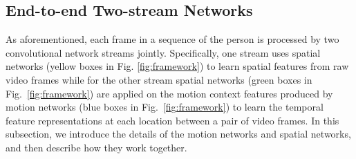 \documentclass[journal]{IEEEtran}
\begin{document}
\subsection{End-to-end Two-stream  Networks }
As aforementioned,  each frame in a sequence of the person is processed by  two convolutional network streams jointly. Specifically, one stream uses spatial networks (yellow boxes in Fig. \ref{fig:framework}) to learn spatial features from raw video frames while for the other stream spatial networks (green boxes in Fig.~\ref{fig:framework}) are applied on the motion context features produced by motion networks (blue boxes in Fig.~\ref{fig:framework}) to learn the temporal feature representations at each location between a pair of video frames. In this subsection, we introduce the details of the motion networks and spatial networks, and then describe how they work together. 
\end{document}
